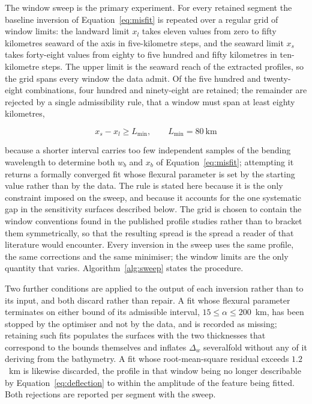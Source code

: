 \documentclass[final]{agujournal2019}
\begin{document}
The window sweep is the primary experiment. For every retained segment the
baseline inversion of Equation~\eqref{eq:misfit} is repeated over a regular grid
of window limits: the landward limit $x_{l}$ takes eleven values from zero to
fifty kilometres seaward of the axis in five-kilometre steps, and the seaward
limit $x_{s}$ takes forty-eight values from eighty to five hundred and fifty
kilometres in ten-kilometre steps. The upper limit is the seaward reach of the
extracted profiles, so the grid spans every window the data admit. Of the five
hundred and twenty-eight combinations, four hundred and ninety-eight are
retained; the remainder are rejected by a single admissibility rule, that a
window must span at least eighty kilometres,
\begin{linenomath*}
\begin{equation}
  x_{s} - x_{l} \geq L_{\min}, \qquad L_{\min} = 80~\mathrm{km}
  \label{eq:minspan}
\end{equation}
\end{linenomath*}
because a shorter interval carries too few independent samples of the bending
wavelength to determine both $w_{b}$ and $x_{b}$ of Equation~\eqref{eq:misfit};
attempting it returns a formally converged fit whose flexural parameter is set
by the starting value rather than by the data. The rule is stated here because
it is the only constraint imposed on the sweep, and because it accounts for the
one systematic gap in the sensitivity surfaces described below. The grid is
chosen to contain the window conventions found in the published profile studies
rather than to bracket them symmetrically, so that the resulting spread is the
spread a reader of that literature would encounter. Every inversion in the sweep
uses the same profile, the same corrections and the same minimiser; the window
limits are the only quantity that varies. Algorithm~\ref{alg:sweep} states the
procedure.

Two further conditions are applied to the output of each inversion rather than
to its input, and both discard rather than repair. A fit whose flexural
parameter terminates on either bound of its admissible interval, $15 \leq \alpha
\leq 200$~km, has been stopped by the optimiser and not by the data, and is
recorded as missing; retaining such fits populates the surfaces with the two
thicknesses that correspond to the bounds themselves and inflates
$\Delta_{w}$ severalfold without any of it deriving from the bathymetry.
A fit whose root-mean-square residual exceeds $1.2$~km is likewise discarded,
the profile in that window being no longer describable by
Equation~\eqref{eq:deflection} to within the amplitude of the feature being
fitted. Both rejections are reported per segment with the sweep.
\end{document}
